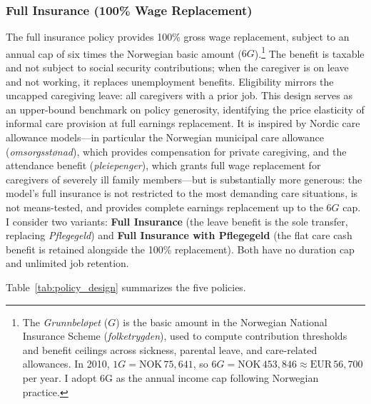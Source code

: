 \subsubsection{Full Insurance (100\% Wage Replacement)}

The full insurance policy provides 100\% gross wage replacement, subject to an annual cap of six times the Norwegian basic amount ($6G$).\footnote{The \textit{Grunnbeløpet} ($G$) is the basic amount in the Norwegian National Insurance Scheme (\textit{folketrygden}), used to compute contribution thresholds and benefit ceilings across sickness, parental leave, and care-related allowances. In 2010, $1G = \text{NOK}\,75{,}641$, so $6G = \text{NOK}\,453{,}846 \approx \text{EUR}\,56{,}700$ per year. I adopt 6G as the annual income cap following Norwegian practice.} The benefit is taxable and not subject to social security contributions; when the caregiver is on leave and not working, it replaces unemployment benefits. Eligibility mirrors the uncapped caregiving leave: all caregivers with a prior job. This design serves as an upper-bound benchmark on policy generosity, identifying the price elasticity of informal care provision at full earnings replacement. It is inspired by Nordic care allowance models---in particular the Norwegian municipal care allowance (\textit{omsorgsstønad}), which provides compensation for private caregiving, and the attendance benefit (\textit{pleiepenger}), which grants full wage replacement for caregivers of severely ill family members---but is substantially more generous: the model's full insurance is not restricted to the most demanding care situations, is not means-tested, and provides complete earnings replacement up to the $6G$ cap. I consider two variants: \textbf{Full Insurance} (the leave benefit is the sole transfer, replacing \textit{Pflegegeld}) and \textbf{Full Insurance with Pflegegeld} (the flat care cash benefit is retained alongside the 100\% replacement). Both have no duration cap and unlimited job retention.

Table~\ref{tab:policy_design} summarizes the five policies.

